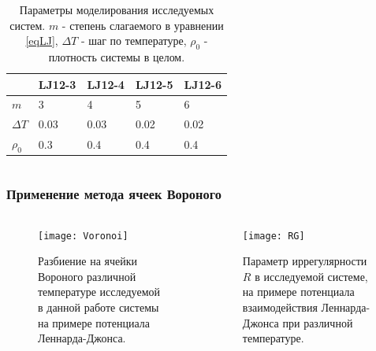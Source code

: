 \documentclass[pdf,hyperref={unicode}]{beamer}
\begin{document}
\begin{frame}
\begin{columns}
\begin{column}{0.5\linewidth}
{\begin{table}[H]
\begin{center}
\begin{tabular}{| l | l | l | l | l |}
\hline
    & LJ12-3 & LJ12-4 & LJ12-5 & LJ12-6 \\ \hline
$m$   &    3    &     4   &    5    &    6    \\ \hline
$\Delta T$ & 0.03 & 0.03 & 0.02 & 0.02 \\ \hline
$\rho_0$ & 0.3  &  0.4  &  0.4  &  0.4  \\ \hline
\end{tabular}
\end{center}
\caption{\tiny Параметры моделирования исследуемых систем. $m$ - степень слагаемого в уравнении \ref{eqLJ}, $\Delta T$ - шаг по температуре,  $\rho_0$ - плотность системы в целом.}
\label{tablParam}
\end{table}

}
\end{column}

\end{columns}
\end{frame}





\begin{frame}
\transdissolve[duration=0.2]
\frametitle{Применение метода ячеек Вороного}
\begin{columns}


\begin{column}{0.54\linewidth}
{
\begin{figure}[h]
\begin{center}
\texttt{[image: Voronoi]}
\caption{\tiny Разбиение на ячейки Вороного различной температуре исследуемой в данной работе системы на примере потенциала Леннарда-Джонса.}
\label{risvoronoiExp}
\end{center}
\end{figure}
}
\end{column}

\begin{column}{0.6\linewidth}
{
\begin{figure}[h]
\begin{center}
\texttt{[image: RG]}
\caption{\tiny Параметр иррегулярности $R$ в исследуемой системе, на примере потенциала взаимодействия Леннарда-Джонса при различной температуре.}
\label{risIregExp}
\end{center}
\end{figure}
}
\end{column}

\end{columns}
\end{frame}
\end{document}
